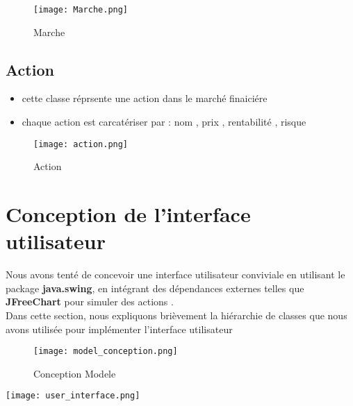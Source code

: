 \documentclass[10pt]{article}
\begin{document}
\begin{figure}
    \centering
    \texttt{[image: Marche.png]}
    \caption{Marche}
    \label{fig:enter-label}
\end{figure}


\subsection{Action}
\begin{itemize}
    \item  cette classe réprsente une action dans le marché finaiciére 

    \item chaque action est carcatériser par : nom , prix , rentabilité , risque 
\end{itemize}

\begin{figure}
    \centering
    \texttt{[image: action.png]}
    \caption{Action}
    \label{fig:enter-label}
\end{figure}



\newpage
\section{\textbf{Conception de l'interface utilisateur}}

Nous avons tenté de concevoir une interface utilisateur conviviale en utilisant le package \textbf{java.swing}, en intégrant des dépendances externes telles que \textbf{JFreeChart} pour simuler des actions . \\
\newline
Dans cette section, nous expliquons brièvement la hiérarchie de classes que nous avons utilisée pour implémenter l'interface utilisateur \\

\begin{figure}
 
    \texttt{[image: model\_conception.png]}
    \caption{Conception Modele}
    \label{fig:enter-label}
\end{figure}





\texttt{[image: user\_interface.png]}
\newline
\end{document}
